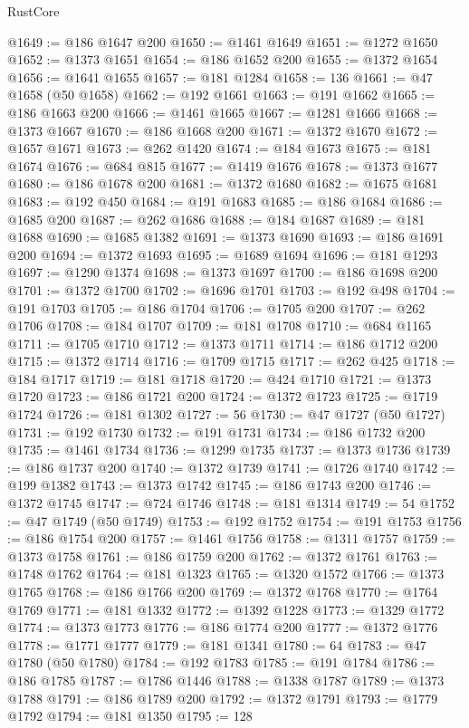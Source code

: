 \begin{lexlean}{RustCore}
\begin{coremodule}
@1649 := @186 @1647 @200
@1650 := @1461 @1649
@1651 := @1272 @1650
@1652 := @1373 @1651
@1654 := @186 @1652 @200
@1655 := @1372 @1654
@1656 := @1641 @1655
@1657 := @181 @1284
@1658 := 136
@1661 := @47 @1658 (@50 @1658)
@1662 := @192 @1661
@1663 := @191 @1662
@1665 := @186 @1663 @200
@1666 := @1461 @1665
@1667 := @1281 @1666
@1668 := @1373 @1667
@1670 := @186 @1668 @200
@1671 := @1372 @1670
@1672 := @1657 @1671
@1673 := @262 @1420
@1674 := @184 @1673
@1675 := @181 @1674
@1676 := @684 @815
@1677 := @1419 @1676
@1678 := @1373 @1677
@1680 := @186 @1678 @200
@1681 := @1372 @1680
@1682 := @1675 @1681
@1683 := @192 @450
@1684 := @191 @1683
@1685 := @186 @1684
@1686 := @1685 @200
@1687 := @262 @1686
@1688 := @184 @1687
@1689 := @181 @1688
@1690 := @1685 @1382
@1691 := @1373 @1690
@1693 := @186 @1691 @200
@1694 := @1372 @1693
@1695 := @1689 @1694
@1696 := @181 @1293
@1697 := @1290 @1374
@1698 := @1373 @1697
@1700 := @186 @1698 @200
@1701 := @1372 @1700
@1702 := @1696 @1701
@1703 := @192 @498
@1704 := @191 @1703
@1705 := @186 @1704
@1706 := @1705 @200
@1707 := @262 @1706
@1708 := @184 @1707
@1709 := @181 @1708
@1710 := @684 @1165
@1711 := @1705 @1710
@1712 := @1373 @1711
@1714 := @186 @1712 @200
@1715 := @1372 @1714
@1716 := @1709 @1715
@1717 := @262 @425
@1718 := @184 @1717
@1719 := @181 @1718
@1720 := @424 @1710
@1721 := @1373 @1720
@1723 := @186 @1721 @200
@1724 := @1372 @1723
@1725 := @1719 @1724
@1726 := @181 @1302
@1727 := 56
@1730 := @47 @1727 (@50 @1727)
@1731 := @192 @1730
@1732 := @191 @1731
@1734 := @186 @1732 @200
@1735 := @1461 @1734
@1736 := @1299 @1735
@1737 := @1373 @1736
@1739 := @186 @1737 @200
@1740 := @1372 @1739
@1741 := @1726 @1740
@1742 := @199 @1382
@1743 := @1373 @1742
@1745 := @186 @1743 @200
@1746 := @1372 @1745
@1747 := @724 @1746
@1748 := @181 @1314
@1749 := 54
@1752 := @47 @1749 (@50 @1749)
@1753 := @192 @1752
@1754 := @191 @1753
@1756 := @186 @1754 @200
@1757 := @1461 @1756
@1758 := @1311 @1757
@1759 := @1373 @1758
@1761 := @186 @1759 @200
@1762 := @1372 @1761
@1763 := @1748 @1762
@1764 := @181 @1323
@1765 := @1320 @1572
@1766 := @1373 @1765
@1768 := @186 @1766 @200
@1769 := @1372 @1768
@1770 := @1764 @1769
@1771 := @181 @1332
@1772 := @1392 @1228
@1773 := @1329 @1772
@1774 := @1373 @1773
@1776 := @186 @1774 @200
@1777 := @1372 @1776
@1778 := @1771 @1777
@1779 := @181 @1341
@1780 := 64
@1783 := @47 @1780 (@50 @1780)
@1784 := @192 @1783
@1785 := @191 @1784
@1786 := @186 @1785
@1787 := @1786 @1446
@1788 := @1338 @1787
@1789 := @1373 @1788
@1791 := @186 @1789 @200
@1792 := @1372 @1791
@1793 := @1779 @1792
@1794 := @181 @1350
@1795 := 128

\end{coremodule}
\end{lexlean}
